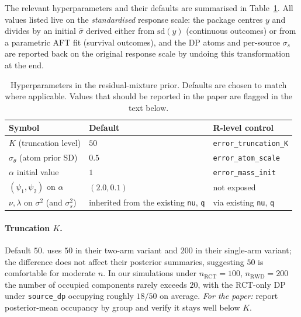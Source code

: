 \documentclass[11pt]{article}
\newcommand{\1}{\mathbf{1}}
\begin{document}
The relevant hyperparameters and their defaults are summarised in Table~\ref{tab:hyperparams}. All values listed live on the \emph{standardised} response scale: the package centres $y$ and divides by an initial $\hat\sigma$ derived either from $\mathrm{sd}(y)$ (continuous outcomes) or from a parametric AFT fit (survival outcomes), and the DP atoms and per-source $\sigma_s$ are reported back on the original response scale by undoing this transformation at the end.

\begin{table}[h]
\centering
\small
\begin{tabular}{lll}
\hline
Symbol & Default & R-level control \\
\hline
$K$ (truncation level)           & $50$            & \texttt{error\_truncation\_K} \\
$\sigma_\theta$ (atom prior SD)  & $0.5$           & \texttt{error\_atom\_scale} \\
$\alpha$ initial value           & $1$             & \texttt{error\_mass\_init} \\
$(\psi_1, \psi_2)$ on $\alpha$   & $(2.0, 0.1)$    & not exposed \\
$\nu, \lambda$ on $\sigma^2$ (and $\sigma_s^2$) & inherited from the existing \texttt{nu}, \texttt{q} & via existing \texttt{nu}, \texttt{q} \\
\hline
\end{tabular}
\caption{Hyperparameters in the residual-mixture prior. Defaults are chosen to match \citet{henderson2020individualized} where applicable. Values that should be reported in the paper are flagged in the text below.}
\label{tab:hyperparams}
\end{table}

\paragraph{Truncation $K$.} Default $50$. \citet{henderson2020individualized} uses $50$ in their two-arm variant and $200$ in their single-arm variant; the difference does not affect their posterior summaries, suggesting $50$ is comfortable for moderate $n$. In our simulations under $n_\mathrm{RCT} = 100$, $n_\mathrm{RWD} = 200$ the number of occupied components rarely exceeds $20$, with the RCT-only DP under \texttt{source\_dp} occupying roughly $18/50$ on average. \emph{For the paper:} report posterior-mean occupancy by group and verify it stays well below $K$.
\end{document}

